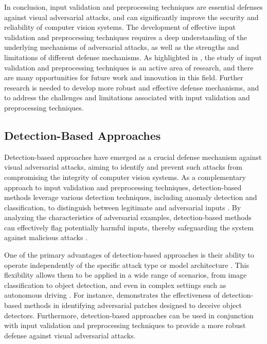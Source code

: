 \documentclass[11pt,a4paper]{article}
\begin{document}
In conclusion, input validation and preprocessing techniques are essential defenses against visual adversarial attacks, and can significantly improve the security and reliability of computer vision systems. The development of effective input validation and preprocessing techniques requires a deep understanding of the underlying mechanisms of adversarial attacks, as well as the strengths and limitations of different defense mechanisms. As highlighted in \cite{doi:10.1186/s42400-018-0012-9}, the study of input validation and preprocessing techniques is an active area of research, and there are many opportunities for future work and innovation in this field. Further research is needed to develop more robust and effective defense mechanisms, and to address the challenges and limitations associated with input validation and preprocessing techniques.


\subsection{Detection-Based Approaches}


Detection-based approaches have emerged as a crucial defense mechanism against visual adversarial attacks, aiming to identify and prevent such attacks from compromising the integrity of computer vision systems. As a complementary approach to input validation and preprocessing techniques, detection-based methods leverage various detection techniques, including anomaly detection and classification, to distinguish between legitimate and adversarial inputs \cite{doi:10.1201/9781351251389-8}. By analyzing the characteristics of adversarial examples, detection-based methods can effectively flag potentially harmful inputs, thereby safeguarding the system against malicious attacks \cite{arxiv:1707.08945}.

One of the primary advantages of detection-based approaches is their ability to operate independently of the specific attack type or model architecture \cite{doi:10.1145/3319535.3339815}. This flexibility allows them to be applied in a wide range of scenarios, from image classification to object detection, and even in complex settings such as autonomous driving \cite{doi:10.1609/aaai.v35i2.16211}. For instance, \cite{arxiv:1906.11897} demonstrates the effectiveness of detection-based methods in identifying adversarial patches designed to deceive object detectors. Furthermore, detection-based approaches can be used in conjunction with input validation and preprocessing techniques to provide a more robust defense against visual adversarial attacks.
\end{document}
